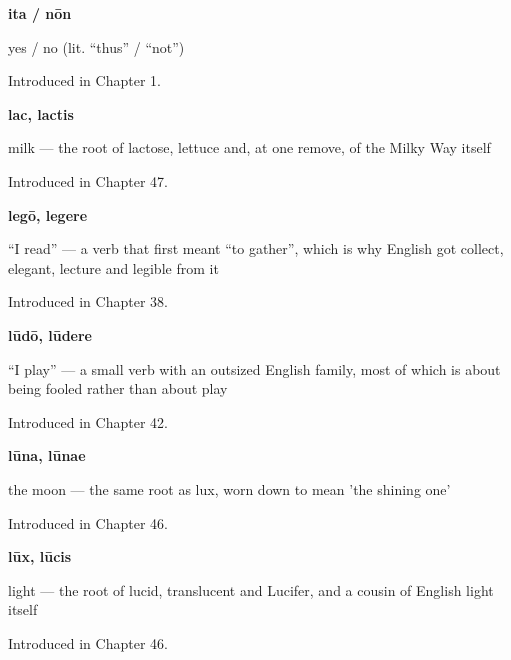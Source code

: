 \noindent\begin{minipage}[t]{\linewidth}
\raggedright
\textbf{ita / nōn}\par
\small yes / no (lit. \textquotedblleft{}thus\textquotedblright{} / \textquotedblleft{}not\textquotedblright{})\par
\footnotesize Introduced in Chapter 1.
\end{minipage}\par\medskip

\noindent\begin{minipage}[t]{\linewidth}
\raggedright
\textbf{lac, lactis}\par
\small milk — the root of lactose, lettuce and, at one remove, of the Milky Way itself\par
\footnotesize Introduced in Chapter 47.
\end{minipage}\par\medskip

\noindent\begin{minipage}[t]{\linewidth}
\raggedright
\textbf{legō, legere}\par
\small \textquotedblleft{}I read\textquotedblright{} — a verb that first meant \textquotedblleft{}to gather\textquotedblright{}, which is why English got collect, elegant, lecture and legible from it\par
\footnotesize Introduced in Chapter 38.
\end{minipage}\par\medskip

\noindent\begin{minipage}[t]{\linewidth}
\raggedright
\textbf{lūdō, lūdere}\par
\small \textquotedblleft{}I play\textquotedblright{} — a small verb with an outsized English family, most of which is about being fooled rather than about play\par
\footnotesize Introduced in Chapter 42.
\end{minipage}\par\medskip

\noindent\begin{minipage}[t]{\linewidth}
\raggedright
\textbf{lūna, lūnae}\par
\small the moon — the same root as lux, worn down to mean 'the shining one'\par
\footnotesize Introduced in Chapter 46.
\end{minipage}\par\medskip

\noindent\begin{minipage}[t]{\linewidth}
\raggedright
\textbf{lūx, lūcis}\par
\small light — the root of lucid, translucent and Lucifer, and a cousin of English light itself\par
\footnotesize Introduced in Chapter 46.
\end{minipage}\par\medskip

